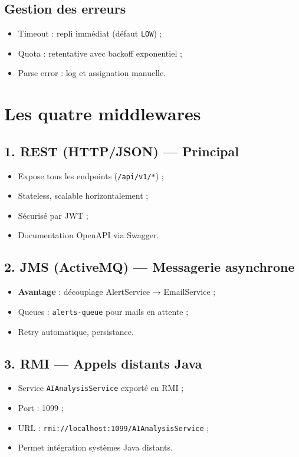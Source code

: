 \documentclass[12pt,a4paper,twoside,openright]{book}
\begin{document}
\subsection{Gestion des erreurs}
\begin{itemize}
  \item Timeout : repli immédiat (défaut \texttt{LOW}) ;
  \item Quota : retentative avec backoff exponentiel ;
  \item Parse error : log et assignation manuelle.
\end{itemize}

\section{Les quatre middlewares}

\subsection{1. REST (HTTP/JSON) — Principal}
\begin{itemize}
  \item Expose tous les endpoints (\texttt{/api/v1/*}) ;
  \item Stateless, scalable horizontalement ;
  \item Sécurisé par JWT ;
  \item Documentation OpenAPI via Swagger.
\end{itemize}

\subsection{2. JMS (ActiveMQ) — Messagerie asynchrone}
\begin{itemize}
  \item \textbf{Avantage} : découplage AlertService → EmailService ;
  \item Queues : \texttt{alerts-queue} pour mails en attente ;
  \item Retry automatique, persistance.
\end{itemize}

\subsection{3. RMI — Appels distants Java}
\begin{itemize}
  \item Service \texttt{AIAnalysisService} exporté en RMI ;
  \item Port : 1099 ;
  \item URL : \texttt{rmi://localhost:1099/AIAnalysisService} ;
  \item Permet intégration systèmes Java distants.
\end{itemize}
\end{document}
